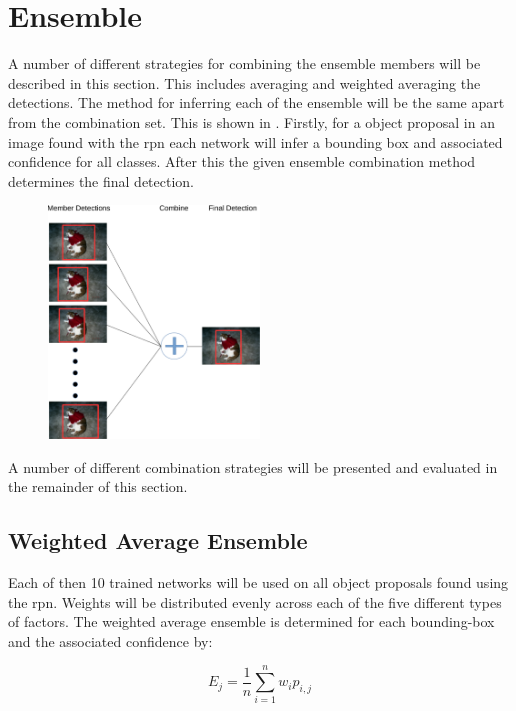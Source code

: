 \section{Ensemble}
A number of different strategies for combining the ensemble members will be described in this section. This includes averaging and weighted averaging the detections. The method for inferring each of the ensemble will be the same apart from the combination set. This is shown in . Firstly, for a object proposal in an image found with the \gls{rpn} each network will infer a bounding box and associated confidence for all classes. After this the given ensemble combination method determines the final detection. 
\begin{figure}[H]
  \centering
    \includegraphics[width=0.5\textwidth]{Figs/Implementation/ensemble.pdf}
      \caption{}
    \label{fig:ensemble_general}
\end{figure}

A number of different combination strategies will be presented and evaluated in the remainder of this section. 

\subsection{Weighted Average Ensemble}
Each of then 10 trained networks will be used on all object proposals found using the \gls{rpn}. Weights will be distributed evenly across each of the five different types of factors. The weighted average ensemble is determined for each bounding-box and the associated confidence by:

\begin{equation}
	E_{j} = \frac{1}{n} \sum_{i=1}^{n} w_ip_{i,j} 
\end{equation}

